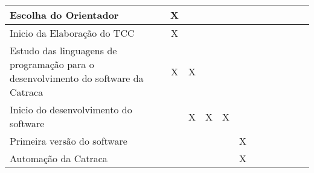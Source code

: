 \begin{table}[ht]
\begin{adjustbox}{width=\textwidth}
\begin{tabular}{|l|l|l|l|l|l|l|l|l|l|l|l|l|}
            Escolha do Orientador                                                                &                        & \multicolumn{1}{c|}{X} &                        &                        &                        &                        &                        &                        &                        &                        &                        &                        \\ \hline
            Inicio da Elaboração do TCC                                                          &                        & \multicolumn{1}{c|}{X} &                        &                        &                        &                        &                        &                        &                        &                        &                        &                        \\ \hline
            Estudo das linguagens de programação para o   desenvolvimento do software da Catraca &                        & \multicolumn{1}{c|}{X} & \multicolumn{1}{c|}{X} &                        &                        &                        &                        &                        &                        &                        &                        &                        \\ \hline
            Inicio do desenvolvimento do software                                                &                        &                        & \multicolumn{1}{c|}{X} & \multicolumn{1}{c|}{X} & \multicolumn{1}{c|}{X} &                        &                        &                        &                        &                        &                        &                        \\ \hline
            Primeira versão do software                                                          &                        &                        &                        &                        &                        & \multicolumn{1}{c|}{X} &                        &                        &                        &                        &                        &                        \\ \hline
            Automação da Catraca                                                                 &                        &                        &                        &                        &                        & \multicolumn{1}{c|}{X} &                        &                        &                        &                        &                        &                        \\ \hline

\end{tabular}
\end{adjustbox}
\end{table}
